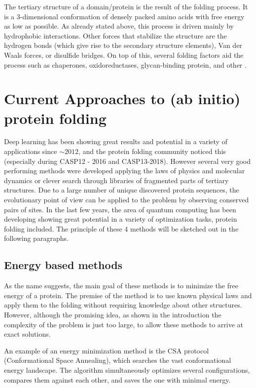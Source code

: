The tertiary structure of a domain/protein is the result of the folding process. 
It is a 3-dimensional conformation of densely packed amino acids with free energy as low as possible. 
As already stated above, this process is driven mainly by hydrophobic interactions. 
Other forces that stabilize the structure are the hydrogen bonds (which give rise to the secondary structure elements), Van der Waals forces, or disulfide bridges. 
On top of this, several folding factors aid the process such as chaperones, oxidoreductases, glycan-binding protein, and other \cite{principles_of_pf}.

\section{Current Approaches to (ab initio) protein folding}

Deep learning has been showing great results and potential in a variety of applications since $\sim2012$, and the protein folding community noticed this (especially during CASP12 - 2016 and CASP13-2018). 
However several very good performing methods were developed applying the laws of physics and molecular dynamics or clever search through libraries of fragmented parts of tertiary structures. 
Due to a large number of unique discovered protein sequences, the evolutionary point of view can be applied to the problem by observing conserved pairs of sites. 
In the last few years, the area of quantum computing has been developing showing great potential in a variety of optimization tasks, protein folding included.%
The principle of these 4 methods will be sketched out in the following paragraphs.

\subsection{Energy based methods}

As the name suggests, the main goal of these methods is to minimize the free energy of a protein. 
The premise of the method is to use known physical laws and apply them to the folding without requiring knowledge about other structures. 
However, although the promising idea, as shown in the introduction the complexity of the problem is just too large, to allow these methods to arrive at exact solutions.

An example of an energy minimization method is the CSA protocol \cite{csa} (Conformational Space Annealing), which searches the vast conformational energy landscape. 
The algorithm simultaneously optimizes several configurations, compares them against each other, and saves the one with minimal energy.

